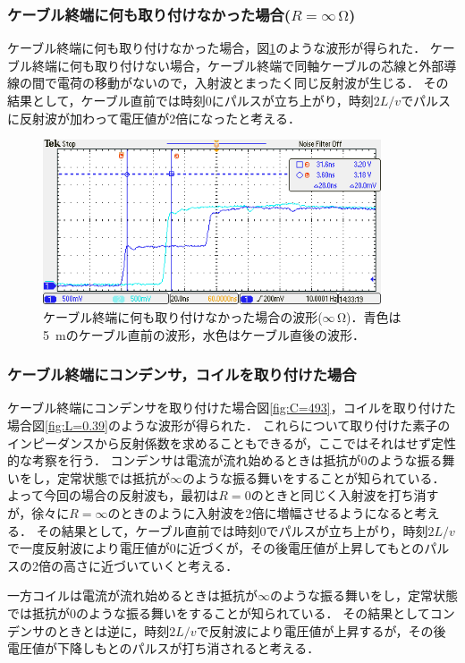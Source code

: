 \documentclass[a4paper,11pt]{jsarticle}
\begin{document}
\subsubsection{ケーブル終端に何も取り付けなかった場合($R=\infty\,\si{\ohm}$)}
ケーブル終端に何も取り付けなかった場合，図\ref{fig:R=inf}のような波形が得られた．
ケーブル終端に何も取り付けない場合，ケーブル終端で同軸ケーブルの芯線と外部導線の間で電荷の移動がないので，入射波とまったく同じ反射波が生じる．
その結果として，ケーブル直前では時刻0にパルスが立ち上がり，時刻$2L/v$でパルスに反射波が加わって電圧値が2倍になったと考える．

\begin{figure}[htbp]
  \centering
  \includegraphics[width=10cm]{TEK00732.png}
  \caption{ケーブル終端に何も取り付けなかった場合の波形($\infty$\,\si{\ohm})．青色は\SI{5}{m}のケーブル直前の波形，水色はケーブル直後の波形．}
  \label{fig:R=inf}
\end{figure}

\subsubsection{ケーブル終端にコンデンサ，コイルを取り付けた場合}
ケーブル終端にコンデンサを取り付けた場合図\ref{fig:C=493}，コイルを取り付けた場合図\ref{fig:L=0.39}のような波形が得られた．
これらについて取り付けた素子のインピーダンスから反射係数を求めることもできるが，ここではそれはせず定性的な考察を行う．
コンデンサは電流が流れ始めるときは抵抗が0のような振る舞いをし，定常状態では抵抗が$\infty$のような振る舞いをすることが知られている．
よって今回の場合の反射波も，最初は$R=0$のときと同じく入射波を打ち消すが，徐々に$R=\infty$のときのように入射波を2倍に増幅させるようになると考える．
その結果として，ケーブル直前では時刻0でパルスが立ち上がり，時刻$2L/v$で一度反射波により電圧値が0に近づくが，その後電圧値が上昇してもとのパルスの2倍の高さに近づいていくと考える．

一方コイルは電流が流れ始めるときは抵抗が$\infty$のような振る舞いをし，定常状態では抵抗が0のような振る舞いをすることが知られている．
その結果としてコンデンサのときとは逆に，時刻$2L/v$で反射波により電圧値が上昇するが，その後電圧値が下降しもとのパルスが打ち消されると考える．
\end{document}
